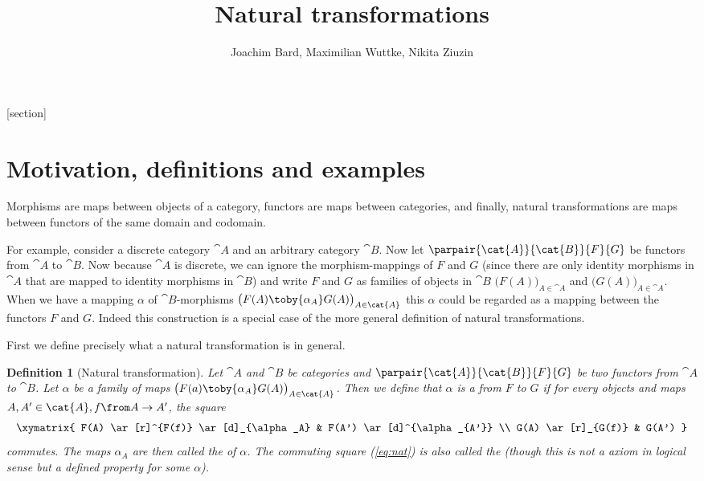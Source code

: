\def\pathToRoot{../../}

\newcommand{\catA}[0]{\cat{A}}
\newcommand{\catB}[0]{\cat{B}}

[section]
\newtheorem{defn}[counter]{Definition}
\newtheorem{exmp}[counter]{Example}
\newtheorem{lemma}[counter]{Lemma}


\title{Natural transformations}
\author{Joachim Bard, Maximilian Wuttke, Nikita Ziuzin}



\maketitle


\section*{Motivation, definitions and examples}
Morphisms are maps between objects of a category, functors are maps between categories, and finally, natural transformations are maps between functors of the same domain and codomain.

For example, consider a discrete category $\catA$ and an arbitrary category $\catB$.
Now let $\parpair{\catA}{\catB}{F}{G}$ be functors from $\catA$ to $\catB$.
Now because $\catA$ is discrete, we can ignore the morphism-mappings of $F$ and $G$ (since there are only identity morphisms in $\catA$ that are mapped to identity morphisms in $\catB$) and write $F$ and $G$ as families
of objects in $\catB$
$\bigl(F(A)\bigr)_{A\in\catA}$ and $\bigl(G(A)\bigr)_{A\in\catA}$.
When we have a mapping $\alpha$ of $\catB$-morphisms
$\bigl(F(A)\toby{\alpha_A}G(A)\bigr)_{A\in\catA}$
this $\alpha$ could be regarded as a mapping between the functors $F$ and $G$.
Indeed this construction is a special case of the more general definition of natural transformations.

First we define precisely what a natural transformation is in general.
\begin{defn}[Natural transformation]
  \label{def:nat}
  Let $\catA$ and $\catB$ be categories and $\parpair{\catA}{\catB}{F}{G}$ be two functors from $\catA$ to $\catB$.
  Let $\alpha$ be a family of maps
  $\bigl(F(a)\toby{\alpha_A}G(A)\bigr)_{A\in\catA}$.
  Then we define that $\alpha$ is a  from $F$ to $G$ if
  for every objects and maps $A, A' \in \catA, f \from A \to A'$, the square
  \begin{equation}
    \label{eq:nat}
    \begin{array}{c}
      \xymatrix{
        F(A) \ar[r]^{F(f)} \ar[d]_{\alpha_A} & F(A') \ar[d]^{\alpha_{A'}} \\
        G(A) \ar[r]_{G(f)} & G(A')
      }
    \end{array}
  \end{equation}
  commutes.
  The maps $\alpha_A$ are then called the  of $\alpha$.
  The commuting square (\ref{eq:nat}) is also called the  (though this is not a axiom in logical sense but a defined property for some $\alpha$).
\end{defn}

